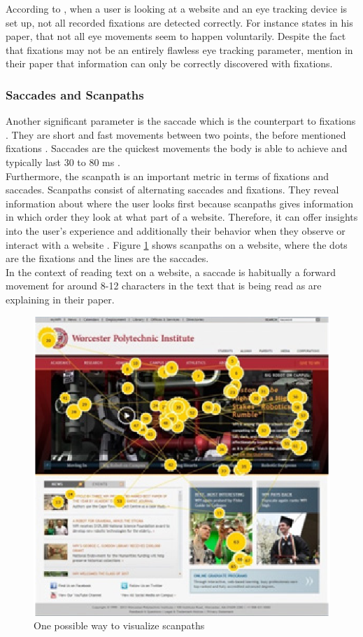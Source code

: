 According to \textcite[]{grzyb2016eye}, when a user is looking at a website and an eye tracking device is set up, not all recorded fixations are detected correctly.
For instance \textcite[]{bruneau2002eyes} states in his paper, that not all eye movements seem to happen voluntarily. 
Despite the fact that fixations may not be an entirely flawless eye tracking parameter, \textcite[]{biedert2010eyebook} mention in their paper that information can only be correctly discovered with fixations.

\subsubsection{Saccades and Scanpaths}
Another significant parameter is the saccade which is the counterpart to fixations \autocite{goldberg2002eye}. They are short and fast movements between two points, the before mentioned fixations \autocite{goldberg2002eye, beymer2007eye}. Saccades are the quickest movements the body is able to achieve and typically last 30 to 80 ms \autocite[]{blascheck2014state}. \\
Furthermore, the scanpath is an important metric in terms of fixations and saccades. Scanpaths consist of alternating saccades and fixations. They reveal information about where the user looks first because scanpaths gives information in which order they look at what part of a website. Therefore, it can offer insights into the user's experience and additionally their behavior when they observe or interact with a website \autocite[]{lorigo2008eye, blascheck2014state}. Figure \ref{figure:Scanpath} shows scanpaths on a website, where the dots are the fixations and the lines are the saccades. \\
In the context of reading text on a website, a saccade is habitually a forward movement for around 8-12 characters in the text that is being read as \textcite[]{beymer2007eye} are explaining in their paper.

\begin{figure}[!ht]
    \centering
    \includegraphics[width=0.75\linewidth]{images/scanpath_djamasbi2014eye.png}
    \caption{
       One possible way to visualize scanpaths \autocite[43]{djamasbi2014eye}
    }
    \label{figure:Scanpath}
\end{figure}

